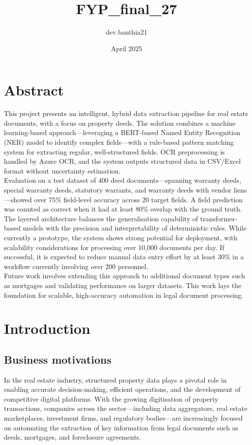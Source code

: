 \documentclass{article}
\title{FYP_final_27}
\author{dev.banthia21 }
\date{April 2025}
\begin{document}
\section{Abstract}

This project presents an intelligent, hybrid data extraction pipeline for real estate documents, with a focus on property deeds. The solution combines a machine learning-based approach—leveraging a BERT-based Named Entity Recognition (NER) model to identify complex fields—with a rule-based pattern matching system for extracting regular, well-structured fields. OCR preprocessing is handled by Azure OCR, and the system outputs structured data in CSV/Excel format without uncertainty estimation. \\

Evaluation on a test dataset of 400 deed documents—spanning warranty deeds, special warranty deeds, statutory warrants, and warranty deeds with vendor liens—showed over 75\% field-level accuracy across 20 target fields. A field prediction was counted as correct when it had at least 80\% overlap with the ground truth. \\

The layered architecture balances the generalisation capability of transformer-based models with the precision and interpretability of deterministic rules. While currently a prototype, the system shows strong potential for deployment, with scalability considerations for processing over 10,000 documents per day. If successful, it is expected to reduce manual data entry effort by at least 30\% in a workflow currently involving over 200 personnel. \\

Future work involves extending this approach to additional document types such as mortgages and validating performance on larger datasets. This work lays the foundation for scalable, high-accuracy automation in legal document processing. \\

\section{Introduction}

\subsection{Business motivations}

In the real estate industry, structured property data plays a pivotal role in enabling accurate decision-making, efficient operations, and the development of competitive digital platforms. With the growing digitisation of property transactions, companies across the sector—including data aggregators, real estate marketplaces, investment firms, and regulatory bodies—are increasingly focused on automating the extraction of key information from legal documents such as deeds, mortgages, and foreclosure agreements. \\
\end{document}

